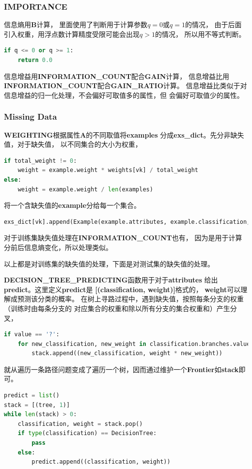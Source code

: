 \documentclass[a4paper, 11pt]{article}
\begin{document}
\subsubsection{IMPORTANCE}
信息熵用\textbf{B}计算，
里面使用了判断用于计算参数$q=0$或$q=1$的情况，
由于后面引入权重，用浮点数计算精度受限可能会出现$q>1$的情况，
所以用不等式判断。
\begin{lstlisting}[language=python]
if q <= 0 or q >= 1:
	return 0.0
\end{lstlisting}

信息增益用\textbf{INFORMATION\_COUNT}配合\textbf{GAIN}计算，
信息增益比用\textbf{INFORMATION\_COUNT}配合\textbf{GAIN\_RATIO}计算。
信息增益比类似于对信息增益的归一化处理，不会偏好可取值多的属性，但
会偏好可取值少的属性。

\subsubsection{Missing Data}
\textbf{WEIGHTING}根据属性\textbf{A}的不同取值将\textbf{examples}
分成\textbf{exs\_dict}。先分非缺失值，对于缺失值，
以不同集合的大小为权重，
\begin{lstlisting}[language=python]
if total_weight != 0:
	weight = example.weight * weights[vk] / total_weight
else:
	weight = example.weight / len(examples)
\end{lstlisting}
将一个含缺失值的\textbf{example}分给每一个集合。
\begin{lstlisting}[language=python]
exs_dict[vk].append(Example(example.attributes, example.classification, weight))
\end{lstlisting}
对于训练集缺失值处理在\textbf{INFORMATION\_COUNT}也有，
因为是用于计算分前后信息熵变化，所以处理类似。

以上都是对训练集的缺失值的处理，下面是对测试集的缺失值的处理。

\textbf{DECISION\_TREE\_PREDICTING}函数用于对于\textbf{attributes}
给出\textbf{predict}。这里定义\textbf{predict}是
\textbf{[(classification, weight)]}格式的，
\textbf{weight}可以理解成预测该分类的概率。
在树上寻路过程中，遇到缺失值，按照每条分支的权重（训练时由每条分支的
对应集合的权重和除以所有分支的集合权重和）产生分叉，
\begin{lstlisting}[language=python]
if value == '?':
	for new_classification, new_weight in classification.branches.values():
		stack.append((new_classification, weight * new_weight))
\end{lstlisting}
就从遍历一条路径问题变成了遍历一个树，因而通过维护一个\textbf{Frontier}如\textbf{stack}即可。
\begin{lstlisting}[language=python]
predict = list()
stack = [(tree, 1)]
while len(stack) > 0:
	classification, weight = stack.pop()
	if type(classification) == DecisionTree:
		pass
	else:
		predict.append((classification, weight))
\end{lstlisting}
\end{document}
